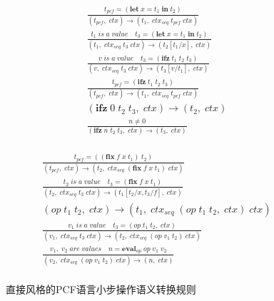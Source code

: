 \begin{figure}[t]
    \centering
    \begin{subfigure}[t]{0.43\textwidth}
        \begin{gather*}
            \displaystyle{\frac{t_{pcf}=(\mathbf{let}\; x = t_1\; \mathbf{in}\; t_2)} {(t_{pcf},\; ctx)\rightarrow (t_1,\; ctx_{seq}\; t_{pcf}\; ctx)}} \\
            \displaystyle{\frac{t_1\; is\; a\; value\quad t_3=(\mathbf{let}\; x = t_1\; \mathbf{in}\; t_2)} {(t_1,\; ctx_{seq}\; t_3\; ctx)\rightarrow (t_2 [t_1/x],\; ctx)}} \\
            \displaystyle{\frac{v\; is\; a\; value\quad t_3=(\mathbf{ifz}\; t_1\; t_2\; t_3)} {(v,\; ctx_{seq}\; t_3\; ctx)\rightarrow (t_3 [v/t_1],\; ctx)}} \\
            \displaystyle{\frac{t_{pcf}=(\mathbf{ifz}\; t_1\; t_2\; t_3)} {(t_{pcf},\; ctx)\rightarrow (t_1,\; ctx_{seq}\; t_{pcf}\; ctx)}} \\
            \displaystyle{(\mathbf{ifz}\; 0\; t_2\; t_3,\; ctx)\rightarrow (t_2,\; ctx)} \\
            \displaystyle{\frac{n \neq 0}{(\mathbf{ifz}\; n\; t_2\; t_3,\; ctx)\rightarrow (t_3,\; ctx)}} \\
        \end{gather*}
    \end{subfigure}
    \begin{subfigure}[t]{0.55\textwidth}
        \begin{gather*}
            \displaystyle{\frac{t_{pcf}=((\mathbf{fix}\; f\; x\; t_1)\; t_2)} {(t_{pcf},\; ctx)\rightarrow (t_2,\; ctx_{seq}\; (\mathbf{fix}\; f\; x\; t_1)\; ctx)}} \\
            \displaystyle{\frac{t_2\; is\; a\; value\quad t_3=(\mathbf{fix}\; f\; x\; t_1)} {(t_2,\; ctx_{seq}\; t_3\; ctx)\rightarrow (t_1 [t_2/x,t_3/f],\; ctx)}} \\
            \displaystyle{(op\; t_1\; t_2,\; ctx)\rightarrow (t_1,\; ctx_{seq}\; (op\; t_1\; t_2,\; ctx)\; ctx)} \\
            \displaystyle{\frac{v_1\; is\; a\; value\quad t_3=(op\; t_1\; t_2,\; ctx)} {(v_1,\; ctx_{seq}\; t_3\; ctx)\rightarrow (t_2,\; ctx_{seq}\; (op\; v_1\; t_2)\; ctx)}} \\
            \displaystyle{\frac{v_1,\; v_2\; are\; values\quad n=\mathbf{eval}_{op}\; op\; v_1\; v_2}{(v_2,\; ctx_{seq}\; (op\; v_1\; t_2)\; ctx)\rightarrow (n,\; ctx)}} \\
        \end{gather*}
    \end{subfigure}   
    \caption{直接风格的PCF语言小步操作语义转换规则} \label{pcfopsem}
\end{figure}

